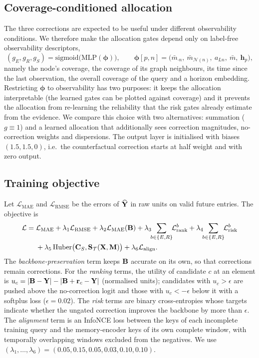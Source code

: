 \subsection{Coverage-conditioned allocation}
\label{sec:allocation}
The three corrections are expected to be useful under different observability conditions. We therefore make the allocation gates depend only on label-free observability descriptors,
\begin{equation}
(g_E,g_R,g_S)=\mathrm{sigmoid}\big(\mathrm{MLP}(\bm\phi)\big),\qquad
\bm\phi[p,n]=\big(\bar m_{\cdot n},\ \bar m_{\mathcal N(n)},\ a_{Ln},\ \bar m,\ \mathbf{h}_p\big),
\end{equation}
namely the node's coverage, the coverage of its graph neighbours, its time since the last observation, the overall coverage of the query and a horizon embedding. Restricting $\bm\phi$ to observability has two purposes: it keeps the allocation interpretable (the learned gates can be plotted against coverage) and it prevents the allocation from re-learning the reliability that the risk gates already estimate from the evidence. We compare this choice with two alternatives: summation ($g\equiv1$) and a learned allocation that additionally sees correction magnitudes, no-correction weights and dispersions. The output layer is initialised with biases $(1.5,1.5,0)$, i.e.\ the counterfactual correction starts at half weight and with zero output.

\subsection{Training objective}
\label{sec:loss}
Let $\mathcal{L}_{\mathrm{MAE}}$ and $\mathcal{L}_{\mathrm{RMSE}}$ be the errors of $\widehat{\mathbf{Y}}$ in raw units on valid future entries. The objective is
\begin{equation}
\begin{aligned}
\mathcal{L}={}&\mathcal{L}_{\mathrm{MAE}}+\lambda_1\mathcal{L}_{\mathrm{RMSE}}+\lambda_2\mathcal{L}_{\mathrm{MAE}}(\B)
+\lambda_3\!\!\sum_{b\in\{E,R\}}\!\!\mathcal{L}^{b}_{\mathrm{rank}}+\lambda_4\!\!\sum_{b\in\{E,R\}}\!\!\mathcal{L}^{b}_{\mathrm{risk}}\\
&+\lambda_5\,\mathrm{Huber}\big(\mathbf{C}_S,\Shift_\Teach(\X,\M)\big)+\lambda_6\mathcal{L}_{\mathrm{align}} .
\end{aligned}
\end{equation}
The \emph{backbone-preservation} term keeps $\mathbf{B}$ accurate on its own, so that corrections remain corrections. For the \emph{ranking} terms, the utility of candidate $c$ at an element is $u_c=|\mathbf{B}-\mathbf{Y}|-|\mathbf{B}+\mathbf{r}_c-\mathbf{Y}|$ (normalised units); candidates with $u_c>\epsilon$ are pushed above the no-correction logit and those with $u_c<-\epsilon$ below it with a softplus loss ($\epsilon=0.02$). The \emph{risk} terms are binary cross-entropies whose targets indicate whether the ungated correction improves the backbone by more than $\epsilon$. The \emph{alignment} term is an InfoNCE loss \citep{oord2018cpc} between the keys of each incomplete training query and the memory-encoder keys of its own complete window, with temporally overlapping windows excluded from the negatives. We use $(\lambda_1,\dots,\lambda_6)=(0.05,0.15,0.05,0.03,0.10,0.10)$.

